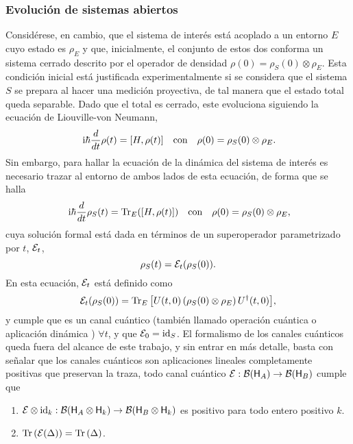 \subsubsection{Evolución de sistemas abiertos}


Considérese, en cambio, que el sistema de interés está acoplado a un entorno $E$ cuyo estado es $\rho_{E}$ y que, inicialmente, el conjunto de estos dos conforma un sistema cerrado descrito por el operador de densidad $\rho(0)=\rho_{S}(0)\otimes\rho_{E}$. Esta condición inicial está justificada experimentalmente si se considera que el sistema $S$ se prepara al hacer una medición proyectiva, de tal manera que el estado total queda separable. Dado que el total es cerrado, este evoluciona siguiendo la ecuación de Liouville-von Neumann,
\begin{align}
    \rmi\hbar\frac{d}{d t} \rho(t)=[H,\rho(t)] && \text{con} && \rho(0)=\rho_{S}(0)\otimes\rho_{E}\rlap{.}\nonumber
\end{align}
Sin embargo, para hallar la ecuación de la dinámica del sistema de interés es necesario trazar al entorno de ambos lados de esta ecuación, de forma que se halla
\begin{align}
    \rmi\hbar\frac{d}{d t} \rho_{S}(t)=\Tr_{E}([H,\rho(t)]) && \text{con} && \rho(0)=\rho_{S}(0)\otimes\rho_{E}\rlap{,}\nonumber
\end{align}
cuya solución formal está dada en términos de un superoperador parametrizado por $t$, $\mathcal{E}_{t}$,
\begin{equation}
    \rho_{S}(t)=\mathcal{E}_{t}(\rho_{S}(0)).\nonumber
\end{equation}
En esta ecuación, $\mathcal{E}_{t}$ está definido como
 \begin{equation}
    \mathcal{E}_{t}(\rho_{S}(0))=\Tr_{E}\qty[U(t,0)\left(\rho_{S}(0)\otimes\rho_{E}\right)U^{\dag}(t,0)],\nonumber
 \end{equation}
 y cumple que es un canal cuántico \cite{Ziman} (también llamado operación cuántica \cite{Chuang} o aplicación dinámica \cite{Breuer}) $\forall t$, y que $\mathcal{E}_0=\text{id}_S$. El formalismo de los canales cuánticos queda fuera del alcance de este trabajo, y sin entrar en más detalle, basta con señalar que los canales cuánticos son aplicaciones lineales completamente positivas que preservan la traza, \ie{} todo canal cuántico $\mathcal{E}:\mathcal{B}({\sf H}_{A})\rightarrow \mathcal{B}({\sf H}_{B})$ cumple que \cite{Watrous}
 \begin{enumerate}
    \item $\mathcal{E}\otimes \text{id}_{k}: \mathcal{B}({\sf H}_A \otimes {\sf H}_k)\to \mathcal{B}({\sf H}_B \otimes {\sf H}_k)$ es positivo para todo entero positivo $k$.
    \item $\Tr\qty(\mathcal{E}(\Delta))=\Tr\qty(\Delta)$.
 \end{enumerate}
